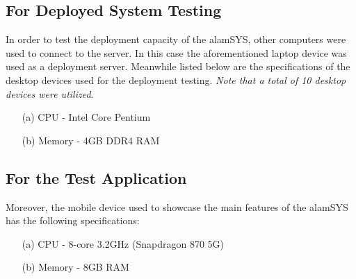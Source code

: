 \subsection{For Deployed System Testing}
In order to test the deployment capacity of the alamSYS, other computers were
used to connect to the server. In this case the aforementioned laptop device
was used as a deployment server. Meanwhile listed below are the specifications
of the desktop devices used for the deployment testing. \textit{Note that a total
of 10 desktop devices were utilized}.
\begin{itemize}
    \item[(a)] CPU - Intel Core Pentium
    \item[(b)] Memory - 4GB DDR4 RAM
\end{itemize}


\subsection{For the Test Application}
Moreover, the mobile device used to showcase the main features of the
alamSYS has the following specifications:
\begin{itemize}
    \item[(a)] CPU - 8-core 3.2GHz (Snapdragon 870 5G)
    \item[(b)] Memory - 8GB RAM
\end{itemize}